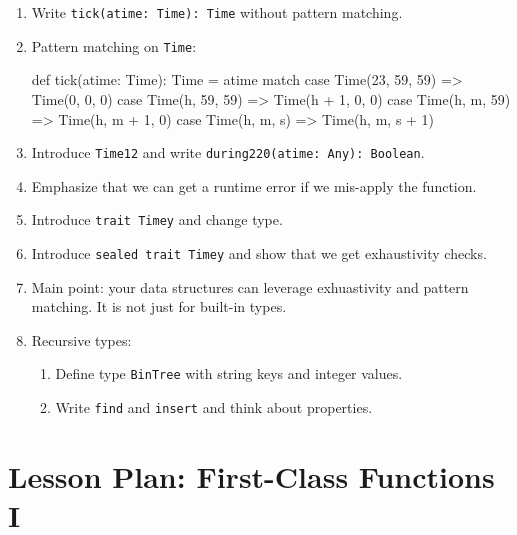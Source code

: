 \documentclass[9pt]{extbook}
\begin{document}
\begin{enumerate}
  \item Write \lstinline|tick(atime: Time): Time| without pattern matching.

  \item Pattern matching on \lstinline|Time|:

  \begin{scalacode}
  def tick(atime: Time): Time = atime match {
    case Time(23, 59, 59) => Time(0, 0, 0)
    case Time(h, 59, 59) => Time(h + 1, 0, 0)
    case Time(h, m, 59) => Time(h, m + 1, 0)
    case Time(h, m, s) => Time(h, m, s + 1)
  }
  \end{scalacode}

  \item Introduce \lstinline|Time12| and write \lstinline|during220(atime: Any): Boolean|.

  \item Emphasize that we can get a runtime error if we mis-apply the function.

  \item Introduce \lstinline|trait Timey| and change type.

  \item Introduce \lstinline|sealed trait Timey| and show that we get exhaustivity checks.

  \item Main point: your data structures can leverage
  exhuastivity and pattern matching. It is not just for built-in
  types.

  \item Recursive types:

  \begin{enumerate}

  \item Define type \lstinline|BinTree| with string keys and integer values.

  \item Write \lstinline|find| and \lstinline|insert| and think about properties.

  \end{enumerate}

\end{enumerate}

\chapter{Lesson Plan: First-Class Functions I}
\end{document}
